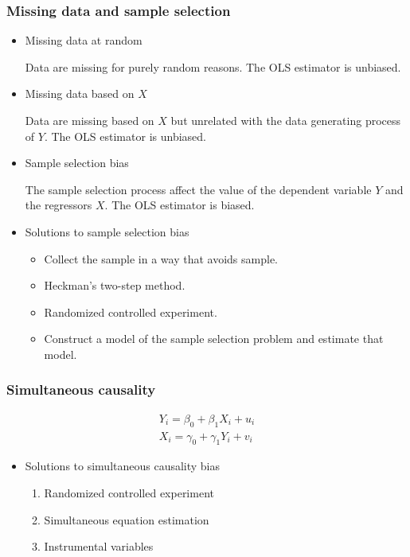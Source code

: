 \documentclass[a4paper,10pt]{article}
\begin{document}
\subsubsection*{Missing data and sample selection}
\label{sec:org2fb64e6}
\begin{itemize}
\item Missing data at random
\label{sec:orgae9db91}

Data are missing for purely random reasons. The OLS estimator is
unbiased. 

\item Missing data based on \(X\)
\label{sec:orgf515558}

Data are missing based on \(X\) but unrelated with the data generating
process of \(Y\). The OLS estimator is unbiased. 

\item Sample selection bias
\label{sec:orgdcab18f}

The sample selection process affect the value of the dependent
variable \(Y\) and the regressors \(X\). The OLS estimator is biased. 

\item Solutions to sample selection bias
\label{sec:orgb8d5b28}
\begin{itemize}
\item Collect the sample in a way that avoids sample.
\item Heckman's two-step method.
\item Randomized controlled experiment.
\item Construct a model of the sample selection problem and estimate that
model.
\end{itemize}
\end{itemize}

\subsubsection*{Simultaneous causality}
\label{sec:org17a6710}

\begin{gather*}
Y_i = \beta_0 + \beta_1 X_i + u_i \\
X_i = \gamma_0 + \gamma_1 Y_i + v_i
\end{gather*}

\begin{itemize}
\item Solutions to simultaneous causality bias
\label{sec:orgb76a57c}

\begin{enumerate}
\item Randomized controlled experiment
\item Simultaneous equation estimation
\item Instrumental variables
\end{enumerate}
\end{itemize}
\end{document}
